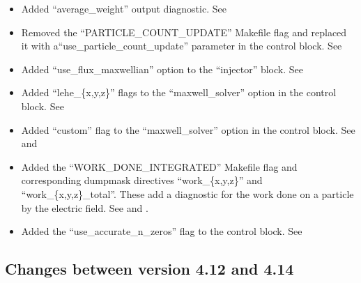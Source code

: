 \begin{itemize}
\item Added ``average\_weight'' output diagnostic.
    See 
\item Removed the ``PARTICLE\_COUNT\_UPDATE'' Makefile flag and replaced
    it with a\linebreak ``use\_particle\_count\_update'' parameter in the
    control block. See 
\item Added ``use\_flux\_maxwellian'' option to the ``injector'' block.
    See 
\item Added ``lehe\_\{x,y,z\}'' flags to the ``maxwell\_solver'' option in
    the control block. See 
\item Added ``custom'' flag to the ``maxwell\_solver'' option in
    the control block. See  and 
\item Added the ``WORK\_DONE\_INTEGRATED'' Makefile flag and corresponding
    dumpmask directives ``work\_\{x,y,z\}'' and ``work\_\{x,y,z\}\_total''.
    These add a diagnostic for the work done on a particle by the electric
    field. See  and .
\item Added the ``use\_accurate\_n\_zeros'' flag to the control block.
    See 
\end{itemize}
\bigskip


\subsection{Changes between version 4.12 and 4.14}

